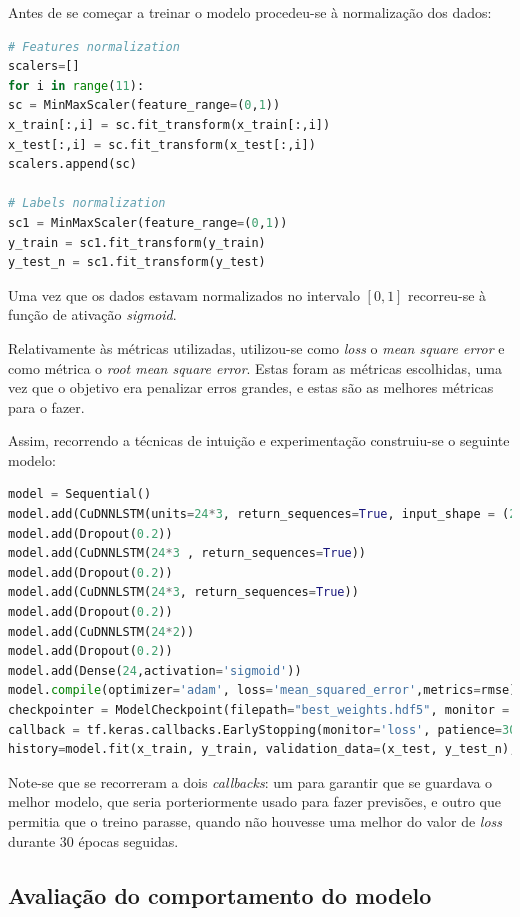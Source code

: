 \documentclass[a4paper, 12pt]{article}
\begin{document}
Antes de se começar a treinar o modelo procedeu-se à normalização dos dados:

\begin{lstlisting}[language=Python]
# Features normalization
scalers=[]
for i in range(11):
sc = MinMaxScaler(feature_range=(0,1))
x_train[:,i] = sc.fit_transform(x_train[:,i])
x_test[:,i] = sc.fit_transform(x_test[:,i])
scalers.append(sc)

# Labels normalization
sc1 = MinMaxScaler(feature_range=(0,1))
y_train = sc1.fit_transform(y_train)
y_test_n = sc1.fit_transform(y_test)
\end{lstlisting}

Uma vez que os dados estavam normalizados no intervalo $[0,1]$ recorreu-se à função de ativação \textit{sigmoid}.

Relativamente às métricas utilizadas, utilizou-se como \textit{loss} o \textit{mean square error} e como métrica o \textit{root mean square error}. Estas foram as métricas escolhidas, uma vez que o  objetivo era penalizar erros grandes, e estas são as melhores métricas para o fazer.

Assim, recorrendo a técnicas de intuição e experimentação construiu-se o seguinte modelo:

\begin{lstlisting}[language=Python]
model = Sequential()
model.add(CuDNNLSTM(units=24*3, return_sequences=True, input_shape = (24*3,11) ) )
model.add(Dropout(0.2))
model.add(CuDNNLSTM(24*3 , return_sequences=True))
model.add(Dropout(0.2))
model.add(CuDNNLSTM(24*3, return_sequences=True))
model.add(Dropout(0.2))
model.add(CuDNNLSTM(24*2))
model.add(Dropout(0.2))
model.add(Dense(24,activation='sigmoid'))
model.compile(optimizer='adam', loss='mean_squared_error',metrics=rmse)
checkpointer = ModelCheckpoint(filepath="best_weights.hdf5", monitor = 'val_loss', verbose=1, save_best_only=True)
callback = tf.keras.callbacks.EarlyStopping(monitor='loss', patience=30)
history=model.fit(x_train, y_train, validation_data=(x_test, y_test_n), epochs=1000, callbacks=[callback, checkpointer])
\end{lstlisting}

Note-se que se recorreram a dois \textit{callbacks}: um para garantir que se guardava o melhor modelo, que seria porteriormente usado para fazer previsões, e outro que permitia que o treino parasse, quando não houvesse uma melhor do valor de \textit{loss} durante $30$ épocas seguidas.

\subsection{Avaliação do comportamento do modelo}
\end{document}

